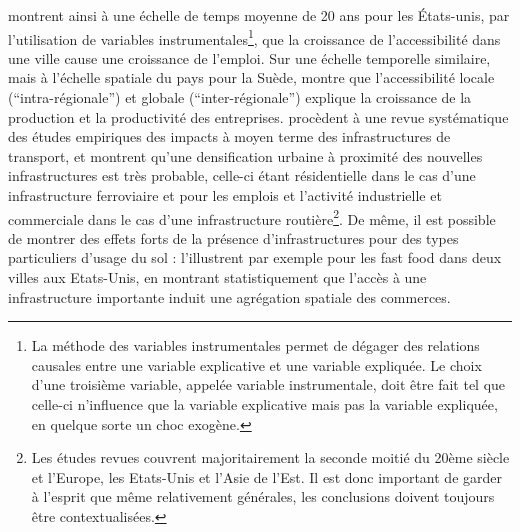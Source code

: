 {\cite{duranton2012urban} montrent ainsi à une échelle de temps moyenne de 20 ans pour les États-unis, par l'utilisation de variables instrumentales\footnote{La méthode des variables instrumentales permet de dégager des relations causales entre une variable explicative et une variable expliquée. Le choix d'une troisième variable, appelée variable instrumentale, doit être fait tel que celle-ci n'influence que la variable explicative mais pas la variable expliquée, en quelque sorte un choc exogène.}, que la croissance de l'accessibilité dans une ville cause une croissance de l'emploi. Sur une échelle temporelle similaire, mais à l'échelle spatiale du pays pour la Suède, \cite{johansson1993infrastructure} montre que l'accessibilité locale (``intra-régionale'') et globale (``inter-régionale'') explique la croissance de la production et la productivité des entreprises. \cite{doi:10.1080/01441647.2016.1168887} procèdent à une revue systématique des études empiriques des impacts à moyen terme des infrastructures de transport, et montrent qu'une densification urbaine à proximité des nouvelles infrastructures est très probable, celle-ci étant résidentielle dans le cas d'une infrastructure ferroviaire et pour les emplois et l'activité industrielle et commerciale dans le cas d'une infrastructure routière\footnote{Les études revues couvrent majoritairement la seconde moitié du 20ème siècle et l'Europe, les Etats-Unis et l'Asie de l'Est. Il est donc important de garder à l'esprit que même relativement générales, les conclusions doivent toujours être contextualisées.}. De même, il est possible de montrer des effets forts de la présence d'infrastructures pour des types particuliers d'usage du sol : \cite{nilsson2016measuring} l'illustrent par exemple pour les fast food dans deux villes aux Etats-Unis, en montrant statistiquement que l'accès à une infrastructure importante induit une agrégation spatiale des commerces.
}






